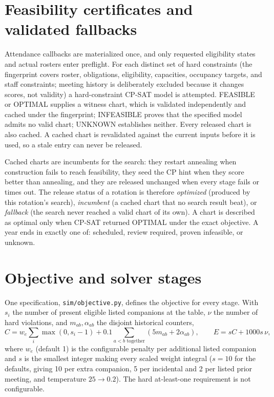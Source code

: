 \documentclass[11pt,a4paper]{article}
\begin{document}
\section{Feasibility certificates and validated fallbacks}
Attendance callbacks are materialized once, and only requested eligibility states and actual rosters enter preflight. For each distinct set of hard constraints (the fingerprint covers roster, obligations, eligibility, capacities, occupancy targets, and staff constraints; meeting history is deliberately excluded because it changes scores, not validity) a hard-constraint CP-SAT model is attempted. FEASIBLE or OPTIMAL supplies a witness chart, which is validated independently and cached under the fingerprint; INFEASIBLE proves that the specified model admits no valid chart; UNKNOWN establishes neither. Every released chart is also cached. A cached chart is revalidated against the current inputs before it is used, so a stale entry can never be released.

Cached charts are incumbents for the search: they restart annealing when construction fails to reach feasibility, they seed the CP hint when they score better than annealing, and they are released unchanged when every stage fails or times out. The release status of a rotation is therefore \emph{optimized} (produced by this rotation's search), \emph{incumbent} (a cached chart that no search result beat), or \emph{fallback} (the search never reached a valid chart of its own). A chart is described as optimal only when CP-SAT returned OPTIMAL under the exact objective. A year ends in exactly one of: scheduled, review required, proven infeasible, or unknown.

\section{Objective and solver stages}
One specification, \texttt{sim/objective.py}, defines the objective for every stage. With $s_i$ the number of present eligible listed companions at the table, $\nu$ the number of hard violations, and $m_{ab},\alpha_{ab}$ the disjoint historical counters,
\[
 C=w_e\sum_i\max(0,s_i-1)+0.1\sum_{a<b\text{ together}}(5m_{ab}+2\alpha_{ab}),\qquad E=sC+1000s\,\nu,
\]
where $w_e$ (default 1) is the configurable penalty per additional listed companion and $s$ is the smallest integer making every scaled weight integral ($s=10$ for the defaults, giving 10 per extra companion, 5 per incidental and 2 per listed prior meeting, and temperature $25\to0.2$). The hard at-least-one requirement is not configurable.
\end{document}
